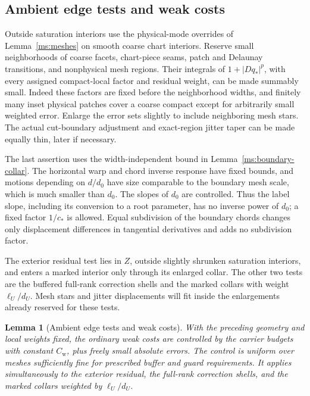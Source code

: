 \documentclass[11pt]{article}
\numberwithin{equation}{section}
\newtheorem{lemma}[theorem]{Lemma}
\theoremstyle{definition}
\theoremstyle{remark}
\begin{document}
\subsection{Ambient edge tests and weak costs}
\label{ha:weak-costs}

Outside saturation interiors use the physical-mode overrides of
Lemma~\ref{ms:meshes} on smooth coarse chart interiors.  Reserve small
neighborhoods of coarse facets, chart-piece seams, patch and Delaunay
transitions, and nonphysical mesh regions.  Their integrals of
$1+|Dq_*|^p$, with every assigned compact-local factor and residual
weight, can be made summably small.  Indeed these factors are fixed
before the neighborhood widths, and finitely many inset physical
patches cover a coarse compact except for arbitrarily small weighted
error.  Enlarge the error sets slightly to include neighboring mesh
stars.  The actual cut-boundary adjustment and exact-region jitter
taper can be made equally thin, later if necessary.

The last assertion uses the width-independent bound in
Lemma~\ref{ms:boundary-collar}.  The horizontal warp and chord inverse
response have fixed bounds, and motions depending on $d/d_0$ have
size comparable to the boundary mesh scale, which is much smaller
than $d_0$.  The slopes of $d_0$ are controlled.  Thus the label
slope, including its conversion to a root parameter, has no inverse
power of $d_0$; a fixed factor $1/c_*$ is allowed.  Equal subdivision
of the boundary chords changes only displacement differences in
tangential derivatives and adds no subdivision factor.

The exterior residual test lies in $Z$, outside slightly shrunken
saturation interiors, and enters a marked interior only through
its enlarged collar.  The other two tests are the buffered
full-rank correction shells and the marked collars with weight
$\ell_U/d_U$.  Mesh stars and jitter displacements will fit inside
the enlargements already reserved for these tests.

\begin{lemma}[Ambient edge tests and weak costs]\label{ha:ambient-tests}
With the preceding geometry and local weights fixed, the ordinary
weak costs are controlled by the carrier budgets with constant
$C_{\mathrm w}$, plus freely small absolute errors.  The control is
uniform over meshes sufficiently fine for prescribed buffer and
guard requirements.  It applies simultaneously to the exterior
residual, the full-rank correction shells, and the marked collars
weighted by $\ell_U/d_U$.
\end{lemma}
\end{document}
